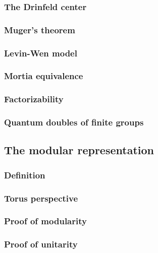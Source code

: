 \documentclass{article}
\theoremstyle{definition}
\newcommand{\0}{\left|0\right>}
\newcommand{\1}{\left|1\right>}
\numberwithin{figure}{section}
\begin{document}
\subsubsection{The Drinfeld center}

\subsubsection{Muger's theorem}

\subsubsection{Levin-Wen model}

\subsubsection{Mortia equivalence}

\subsubsection{Factorizability}

\subsubsection{Quantum doubles of finite groups}



\subsection{The modular representation}

\subsubsection{Definition}

\subsubsection{Torus perspective}

\subsubsection{Proof of modularity}

\subsubsection{Proof of unitarity}
\end{document}
